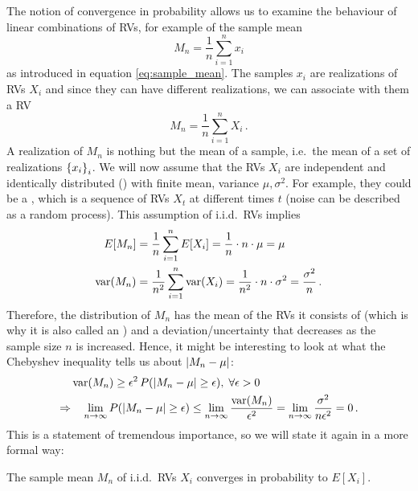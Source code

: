 The notion of convergence in probability allows us to examine the behaviour of linear combinations of RVs, for example of the sample mean
\begin{equation*}
M_n = \frac{1}{n} \sum_{i = 1}^n x_i
\end{equation*}
as introduced in equation \eqref{eq:sample_mean}. The samples $x_i$ are realizations of RVs $X_i$ and since they can have different realizations, we can associate with them a RV
\begin{equation}
M_n = \frac{1}{n} \sum_{i = 1}^n X_i \, .
\end{equation}
A realization of $M_n$ is nothing but the mean of a sample, i.e.~the mean of a set of realizations $\qty{x_i}_i$. We will now assume that the RVs $X_i$ are independent and identically distributed () with finite mean, variance $\mu, \sigma^2$. For example, they could be a , which is a sequence of RVs $X_t$ at different times $t$ (noise can be described as a random process). This assumption of i.i.d.~RVs implies
\begin{align}
E[M_n] &= \frac{1}{n} \sum_{i = 1}^n E[X_i] = \frac{1}{n} \cdot n \cdot \mu = \mu
\\
\operatorname{var}(M_n) &= \frac{1}{n^2} \sum_{i = 1}^n \operatorname{var}(X_i) = \frac{1}{n^2} \cdot n \cdot \sigma^2 = \frac{\sigma^2}{n} \, .
\end{align}
Therefore, the distribution of $M_n$ has the mean of the RVs it consists of (which is why it is also called an ) and a deviation/uncertainty that decreases as the sample size $n$ is increased. Hence, it might be interesting to look at what the Chebyshev inequality tells us about $\abs{M_n - \mu}$:
\begin{align}
&\operatorname{var}(M_n) \geq \epsilon^2 \, P\qty(\abs{M_n - \mu} \geq \epsilon), \; \forall \epsilon > 0
\notag\\
\Rightarrow & \quad \lim_{n \rightarrow \infty} P\qty(\abs{M_n - \mu} \geq \epsilon) \leq \lim_{n \rightarrow \infty} \frac{\operatorname{var}(M_n)}{\epsilon^2} = \lim_{n \rightarrow \infty} \frac{\sigma^2}{n \epsilon^2} = 0 \, .
\end{align}
This is a statement of tremendous importance, so we will state it again in a more formal way:
\begin{prop}
The sample mean $M_n$ of i.i.d.~RVs $X_i$ converges in probability to $E[X_i]$.
\end{prop}
